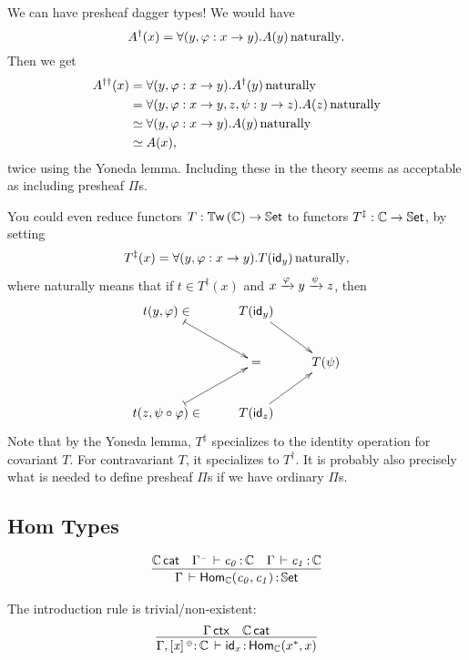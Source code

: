 \documentclass[11pt]{article}
\theoremstyle{plain}
\begin{document}
We can have presheaf dagger types! We would have
\begin{equation}
	{A^\dag(x)} = \forall(y, \varphi : x \to y).A(y) \,\text{naturally}.
\end{equation}
Then we get
\begin{align*}
	{A^{\dag \dag}(x)}
	&= \forall(y, \varphi : x \to y).A^\dag(y) \,\text{naturally} \\
	&= \forall(y, \varphi : x \to y, z, \psi : y \to z).A(z) \,\text{naturally} \\
	&\simeq \forall(y, \varphi : x \to y).A(y) \,\text{naturally} \\
	&\simeq A(x),
\end{align*}
twice using the Yoneda lemma. Including these in the theory seems as acceptable as including presheaf $\Pi$s.

You could even reduce functors $T : \mathbb{T}\mathsf{w}\left(\mathbb{C}\right) \to \mathbb{S}\mathsf{et}$ to functors $T^\ddag : \mathbb{C} \to \mathbb{S}\mathsf{et}$, by setting
\begin{equation}
	T^\ddag(x) = \forall(y, \varphi : x \to y).T(\mathsf{id}_{y}) \,\text{naturally},
\end{equation}
where naturally means that if $t \in T^\ddag(x)$ and $x \xrightarrow{\varphi} y \xrightarrow{\psi} z$, then
\begin{equation}
	\xymatrix{
		t(y, \vfi) \in \ar@{|->}[rd] & T(\idm y) \ar[rd] \\
		& = & T(\psi) \\
		t(z, \psi \circ \vfi) \in \ar@{|->}[ru] & T(\idm z) \ar[ru]
	}
\end{equation}
Note that by the Yoneda lemma, $T^\ddag$ specializes to the identity operation for covariant $T$. For contravariant $T$, it specializes to $T^\dagger$. It is probably also precisely what is needed to define presheaf $\Pi$s if we have ordinary $\Pi$s.

\subsection{Hom Types}
\[
\begin{array}{c}
\infer{\ofdtp{\Gamma}{\Hom{\C}{c_0}{c_1}}{\types}}
      {\wfdtp{\C} &
        \oftp{\Gamma^\con}{c_0}{\C} & 
        \oftp{\Gamma}{c_1}{\C} 
      }
\end{array}
\]

The introduction rule is trivial/non-existent:
\[
	\infer{
		\oftp{\Gamma, \twcatvar{x}{\coc}{\C}}{\idm x}{\Hom{\C}{x^*}{x}}
	}{
		\wfctx{\Gamma} & \wfdtp{\C}
	}
\]
\end{document}
